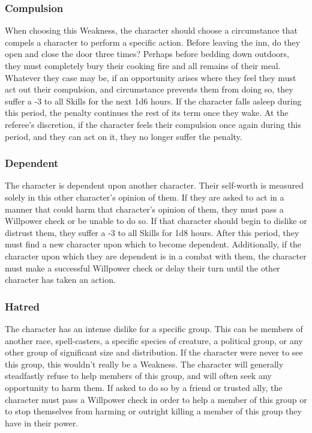 \documentclass[oneside]{book}
\begin{document}
\begin{multicols}{2}
\subsubsection{Compulsion}
When choosing this Weakness, the character should choose a circumstance that compels a character to perform a specific action. Before leaving the inn, do they open and close the door three times? Perhaps before bedding down outdoors, they must completely bury their cooking fire and all remains of their meal. Whatever they case may be, if an opportunity arises where they feel they must act out their compulsion, and circumstance prevents them from doing so, they suffer a -3 to all Skills for the next 1d6 hours. If the character falls asleep during this period, the penalty continues the rest of its term once they wake. At the referee's discretion, if the character feels their compulsion once again during this period, and they can act on it, they no longer suffer the penalty. 

\subsubsection{Dependent}
The character is dependent upon another character. Their self-worth is measured solely in this other character's opinion of them. If they are asked to act in a manner that could harm that character's opinion of them, they must pass a Willpower check or be unable to do so. If that character should begin to dislike or distrust them, they suffer a -3 to all Skills for 1d8 hours. After this period, they must find a new character upon which to become dependent. Additionally, if the character upon which they are dependent is in a combat with them, the character must make a successful Willpower check or delay their turn until the other character has taken an action. 

\subsubsection{Hatred}
The character has an intense dislike for a specific group. This can be members of another race, spell-casters, a specific species of creature, a political group, or any other group of significant size and distribution. If the character were never to see this group, this wouldn't really be a Weakness. The character will generally steadfastly refuse to help members of this group, and will often seek any opportunity to harm them. If asked to do so by a friend or trusted ally, the character must pass a Willpower check in order to help a member of this group or to stop themselves from harming or outright killing a member of this group they have in their power.

\end{multicols}
\end{document}
